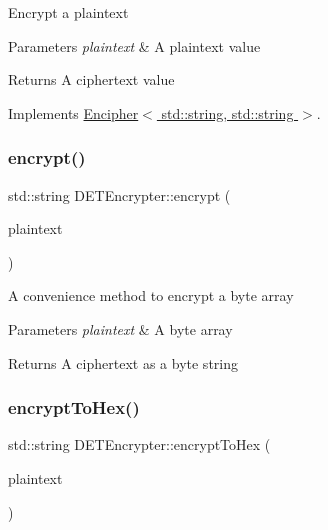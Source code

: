 Encrypt a plaintext 
\begin{DoxyParams}{Parameters}
{\em plaintext} & A plaintext value \\
\hline
\end{DoxyParams}
\begin{DoxyReturn}{Returns}
A ciphertext value 
\end{DoxyReturn}


Implements \hyperlink{classEncipher_aaf8138eb280608bfd03c6eb762ffc010}{Encipher$<$ std\+::string, std\+::string $>$}.

\mbox{\label{classDETEncrypter_a0755264964442bb1593cf1ffd0bbe274}} 
\subsubsection{\texorpdfstring{encrypt()}{encrypt()}\hspace{0.1cm}{\footnotesize\ttfamily [2/2]}}
{\footnotesize\ttfamily std\+::string D\+E\+T\+Encrypter\+::encrypt (\begin{DoxyParamCaption}\item[{Crypto\+P\+P\+::\+Sec\+Byte\+Block \&}]{plaintext }\end{DoxyParamCaption})}

A convenience method to encrypt a byte array 
\begin{DoxyParams}{Parameters}
{\em plaintext} & A byte array \\
\hline
\end{DoxyParams}
\begin{DoxyReturn}{Returns}
A ciphertext as a byte string 
\end{DoxyReturn}
\mbox{\label{classDETEncrypter_ad688722b05535c623af3c32548af23c9}} 
\subsubsection{\texorpdfstring{encrypt\+To\+Hex()}{encryptToHex()}\hspace{0.1cm}{\footnotesize\ttfamily [1/2]}}
{\footnotesize\ttfamily std\+::string D\+E\+T\+Encrypter\+::encrypt\+To\+Hex (\begin{DoxyParamCaption}\item[{std\+::string \&}]{plaintext }\end{DoxyParamCaption})}

